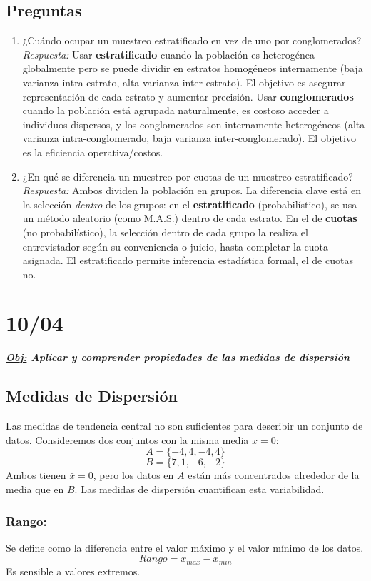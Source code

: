 \documentclass[12pt, letterpaper]{article}
\begin{document}
\subsection{Preguntas}
\begin{enumerate}
    \item ¿Cuándo ocupar un muestreo estratificado en vez de uno por conglomerados?
    \textit{Respuesta:} Usar \textbf{estratificado} cuando la población es heterogénea globalmente pero se puede dividir en estratos homogéneos internamente (baja varianza intra-estrato, alta varianza inter-estrato). El objetivo es asegurar representación de cada estrato y aumentar precisión. Usar \textbf{conglomerados} cuando la población está agrupada naturalmente, es costoso acceder a individuos dispersos, y los conglomerados son internamente heterogéneos (alta varianza intra-conglomerado, baja varianza inter-conglomerado). El objetivo es la eficiencia operativa/costos.
    \item ¿En qué se diferencia un muestreo por cuotas de un muestreo estratificado?
    \textit{Respuesta:} Ambos dividen la población en grupos. La diferencia clave está en la selección \textit{dentro} de los grupos: en el \textbf{estratificado} (probabilístico), se usa un método aleatorio (como M.A.S.) dentro de cada estrato. En el de \textbf{cuotas} (no probabilístico), la selección dentro de cada grupo la realiza el entrevistador según su conveniencia o juicio, hasta completar la cuota asignada. El estratificado permite inferencia estadística formal, el de cuotas no.
\end{enumerate}
\newpage

\section{10/04}
\textbf{\textit{\underline{Obj:} Aplicar y comprender propiedades de las medidas de dispersión}}
\subsection{Medidas de Dispersión}
Las medidas de tendencia central no son suficientes para describir un conjunto de datos. Consideremos dos conjuntos con la misma media $\bar{x}=0$:
\[ A = \{-4, 4, -4, 4\} \]
\[ B = \{7, 1, -6, -2\} \]
Ambos tienen $\bar{x}=0$, pero los datos en $A$ están más concentrados alrededor de la media que en $B$. Las medidas de dispersión cuantifican esta variabilidad.

\subsubsection{Rango:}
Se define como la diferencia entre el valor máximo y el valor mínimo de los datos.
\[ Rango = x_{max} - x_{min} \]
Es sensible a valores extremos.
\end{document}
